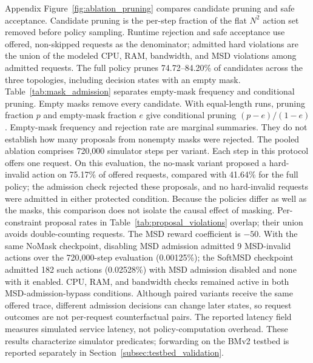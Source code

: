 \documentclass[final,5p]{elsarticle}
\newcommand{\rev}[1]{\textcolor{revisiongreen}{#1}}
\let\newrev\rev
\begin{document}
\newrev{Appendix Figure~\ref{fig:ablation_pruning} compares candidate pruning and safe acceptance. Candidate pruning is the per-step fraction of the flat $N^2$ action set removed before policy sampling. Runtime rejection and safe acceptance use offered, non-skipped requests as the denominator; admitted hard violations are the union of the modeled CPU, RAM, bandwidth, and MSD violations among admitted requests. The full policy prunes 74.72--84.20\% of candidates across the three topologies, including decision states with an empty mask. Table~\ref{tab:mask_admission} separates empty-mask frequency and conditional pruning. Empty masks remove every candidate. With equal-length runs, pruning fraction \(p\) and empty-mask fraction \(e\) give conditional pruning \((p-e)/(1-e)\). Empty-mask frequency and rejection rate are marginal summaries. They do not establish how many proposals from nonempty masks were rejected. The pooled ablation comprises 720,000 simulator steps per variant. Each step in this protocol offers one request. On this evaluation, the no-mask variant proposed a hard-invalid action on 75.17\% of offered requests, compared with 41.64\% for the full policy; the admission check rejected these proposals, and no hard-invalid requests were admitted in either protected condition. Because the policies differ as well as the masks, this comparison does not isolate the causal effect of masking. Per-constraint proposal rates in Table~\ref{tab:proposal_violations} overlap; their union avoids double-counting requests. The MSD reward coefficient is $-50$. With the same NoMask checkpoint, disabling MSD admission admitted 9 MSD-invalid actions over the 720,000-step evaluation (0.00125\%); the SoftMSD checkpoint admitted 182 such actions (0.02528\%) with MSD admission disabled and none with it enabled. CPU, RAM, and bandwidth checks remained active in both MSD-admission-bypass conditions. Although paired variants receive the same offered trace, different admission decisions can change later states, so request outcomes are not per-request counterfactual pairs. The reported latency field measures simulated service latency, not policy-computation overhead. These results characterize simulator predicates; forwarding on the BMv2 testbed is reported separately in Section~\ref{subsec:testbed_validation}.}
\end{document}
